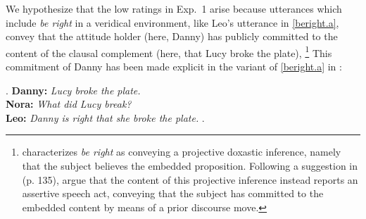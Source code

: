 \documentclass[times,linguex]{glossa}
\begin{document}
We hypothesize that the low ratings in Exp.~1 arise because utterances which include \emph{be right} in a veridical environment, like Leo's utterance in \ref{beright.a}, convey that the attitude holder (here, Danny) has publicly committed to the content of the clausal complement (here, that Lucy broke the plate),%
\footnote{\citet{abusch_lexical_2002,abusch_presupposition_2010} characterizes \emph{be right} as conveying a projective doxastic inference, namely that the subject believes the embedded proposition. Following a suggestion in \citealt{schlenker_local_2010} (p. 135), \citet[p.~73]{anand_factivity_2014} argue that the content of this projective inference instead reports an assertive speech act, conveying that the subject has committed to the embedded content by means of a prior discourse move.
} This commitment of Danny has been made explicit in the variant of \ref{beright.a} in \Next:

\ex.\label{leo1} {\bf Danny:} \emph{Lucy broke the plate.}
\\ {\bf Nora:} \emph{What did Lucy break?}
\\ {\bf Leo:} \emph{Danny is right that she broke the plate.} \z.
\end{document}
